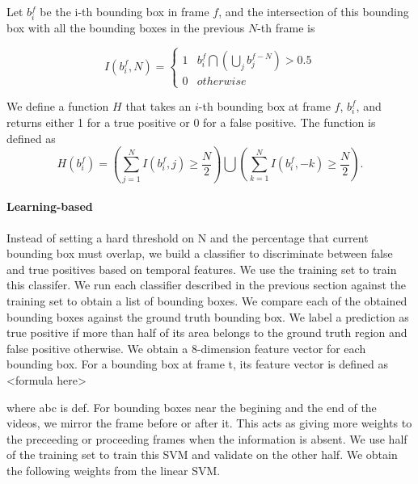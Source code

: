 \documentclass{bmvc2k}
\begin{document}
Let $b{}_{i}^{f}$ be the i-th bounding box in frame $f$, and the
intersection of this bounding box with all the bounding boxes in the
previous $N$-th frame is

\[
I(b_{i}^{f},N)=\begin{cases}
1 & b_{i}^{f}\bigcap(\bigcup_{j}b_{j}^{f-N})>0.5\\
0 & otherwise
\end{cases}
\]


We define a function $H$ that takes an $i$-th bounding box at frame
$f$, $b_{i}^{f}$, and returns either 1 for a true positive or 0
for a false positive. The function is defined as 
\[
H(b_{i}^{f})=\left(\sum_{j=1}^{N}I(b_{i}^{f},j)\ge\frac{N}{2}\right)\bigcup\left(\sum_{k=1}^{N}I(b_{i}^{f},-k)\ge\frac{N}{2}\right).
\]
\paragraph{Learning-based} Instead of setting a hard threshold on N and the percentage that current bounding box must overlap, we build a classifier to discriminate between false and true positives based on temporal features. We use the training set to train this classifer. We run each classifier described in the previous section against the training set to obtain a list of bounding boxes. We compare each of the obtained bounding boxes against the ground truth bounding box. We label a prediction as true positive if more than half of its area belongs to the ground truth region and false positive otherwise. We obtain a 8-dimension feature vector for each bounding box. For a bounding box at frame t, its feature vector is defined as
<formula here>

where abc is def. For bounding boxes near the begining and the end of the videos, we mirror the frame before or after it. This acts as giving more weights to the preceeding or proceeding frames when the information is absent. We use half of the training set to train this SVM and validate on the other half. We obtain the following weights from the linear SVM.
\end{document}
